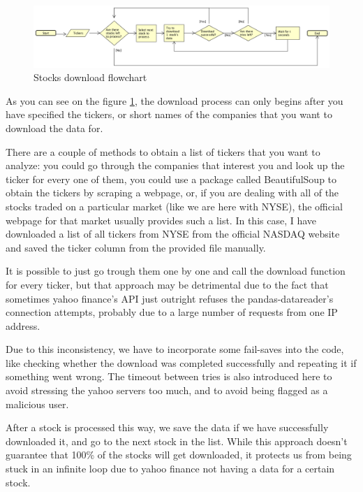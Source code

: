 \documentclass[12pt, a4paper]{article}
\begin{document}

\begin{figure}[H]
    \centering
    \includegraphics[width=\textwidth]{src/stocks/etl/stocks_download_chart}
    \caption{Stocks download flowchart}
    \label{fig:stocks_download_chart}
\end{figure}

As you can see on the figure \ref{fig:stocks_download_chart}, the download process can only begins after you have specified the tickers, or short names of the companies that you want to download the data for.

There are a couple of methods to obtain a list of tickers that you want to analyze: you could go through the companies that interest you and look up the ticker for every one of them, you could use a package called BeautifulSoup to obtain the tickers by scraping a webpage, or, if you are dealing with all of the stocks traded on a particular market (like we are here with NYSE), the official webpage for that market usually provides such a list. In this case, I have downloaded a list of all tickers from NYSE from the official NASDAQ website \cite{nasdaq_companylist} and saved the ticker column from the provided file  manually.

It is possible to just go trough them one by one and call the download function for every ticker, but that approach may be detrimental due to the fact that sometimes yahoo finance’s API  just outright refuses the pandas-datareader’s connection attempts, probably due to a large number of requests from one IP address.

Due to this inconsistency, we have to incorporate some fail-saves into the code, like checking whether the download was completed successfully and repeating it if something went wrong. The timeout between tries is also introduced here to avoid stressing the yahoo servers too much, and to avoid being flagged as a malicious user.

After a stock is processed this way, we save the data if we have successfully downloaded it, and go to the next stock in the list. While this approach doesn’t guarantee that 100\% of the stocks will get downloaded, it protects us from being stuck in an infinite loop due to yahoo finance not having a data for a certain stock.
\end{document}
